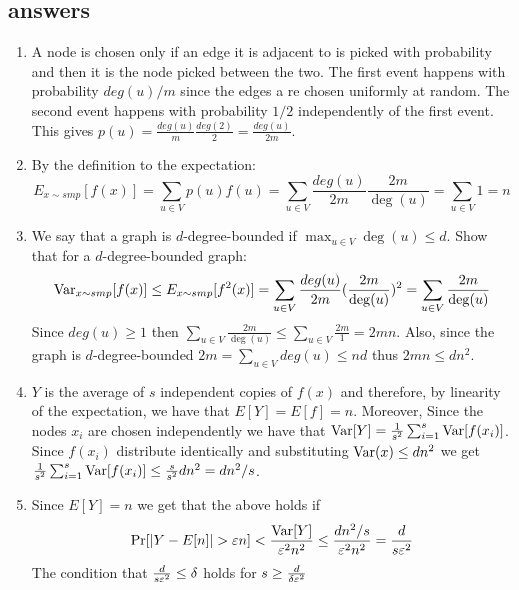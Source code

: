 \documentclass{article}
\begin{document}


\subsection*{answers}
\begin{enumerate}
\item A node is chosen only if an edge it is adjacent to is picked with probability and then it is the node picked between the two.
The first event happens with probability $deg(u)/m$ since the edges a re chosen uniformly at random.
The second event happens with probability $1/2$ independently of the first event. This gives $p(u) = \frac{deg(u)}{m}\frac{deg(2)}{2} = \frac{deg(u)}{2m}$. 


\item By the definition to the expectation:
\[
E_{x \sim smp} [f(x)] = \sum_{u\in V} p(u) f(u) = \sum_{u\in V}  \frac{deg(u)}{2m} \frac{2m}{\deg(u)} =  \sum_{u\in V}1 = n
\]

\item We say that a graph is $d$-degree-bounded if $\max_{u \in V} \deg(u) \le
d$. Show that for a $d$-degree-bounded graph:
\[
{\operatorname{Var}}_{x \sim smp} [f(x)] \le E_{x \sim smp} [f^2(x)]  = \sum_{u\in V}\frac{deg(u)}{2m} (\frac{2m}{\deg(u)})^2 =  \sum_{u\in V}\frac{2m}{\deg(u)} 
\]
Since $deg(u) \ge 1$ then  $\sum_{u\in V}\frac{2m}{\deg(u)} \le  \sum_{u\in V}\frac{2m}{1} = 2mn$.
Also, since the graph is $d$-degree-bounded $2m = \sum_{u \in V}deg(u) \le nd$ thus $ 2mn \le dn^2$.

\item $Y$ is the average of $s$ independent copies of $f(x)$ and therefore, by linearity of the expectation, 
we have that $E[Y] = E[f] = n$. Moreover, Since the nodes $x_i$ are chosen independently we have that 
${\operatorname{Var}}[Y] = \frac{1}{s^2}\sum_{i=1}^{s}{\operatorname{Var}}[f(x_i)]$. Since $f(x_i)$ distribute identically and 
substituting ${\operatorname{Var}}(x) \le dn^2$ we get $\frac{1}{s^2}\sum_{i=1}^{s}{\operatorname{Var}}[f(x_i)]  \le \frac{s}{s^2}dn^2 = dn^2/s$.

\item Since $E[Y] = n$ we get that the above holds if 
\[
\Pr[|Y - E[n]| > \varepsilon n ] < \frac{{\operatorname{Var}}[Y]}{\varepsilon^2 n^2} \le \frac{dn^2/s}{\varepsilon^2 n^2}  = \frac{d}{s \varepsilon^2}
\]
The condition that $\frac{d}{s \varepsilon^2} \le \delta$ holds for $s \ge \frac{d}{\delta \varepsilon^2}$
\end{enumerate}
\pagebreak
\end{document}

